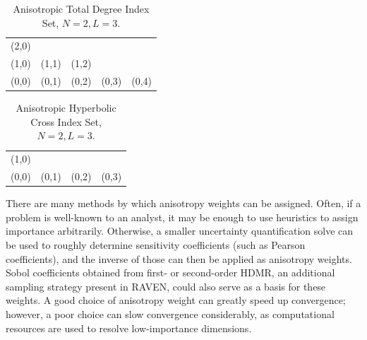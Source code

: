 \begin{table}[h]
  \centering
  \begin{tabular}{c c c c c}
    (2,0) &       &       &       & \\
    (1,0) & (1,1) & (1,2) &       & \\
    (0,0) & (0,1) & (0,2) & (0,3) & (0,4)
  \end{tabular}
  \caption{Anisotropic Total Degree Index Set, $N=2,L=3$.}
  \label{tab:aniTD}
\end{table}

\begin{table}[h]
  \centering
  \begin{tabular}{c c c c}
    (1,0) &       &       &       \\
    (0,0) & (0,1) & (0,2) & (0,3)
  \end{tabular}
  \caption{Anisotropic Hyperbolic Cross Index Set, $N=2,L=3$.}
  \label{tab:aniHC}
\end{table}

There are many methods by which anisotropy weights can be assigned.  Often, if a problem is well-known to an 
analyst, it may be enough to use heuristics to assign importance arbitrarily.  Otherwise, a smaller
uncertainty quantification solve can be used to roughly determine sensitivity coefficients (such as Pearson
coefficients), and the inverse of those can then be applied as anisotropy weights.  Sobol coefficients
obtained from first- or second-order HDMR, an additional sampling strategy present in RAVEN, could also serve as a basis for these weights.
A good choice of anisotropy weight can greatly speed up convergence; however, a
poor choice can slow convergence considerably, as computational resources are used to resolve low-importance
dimensions.

